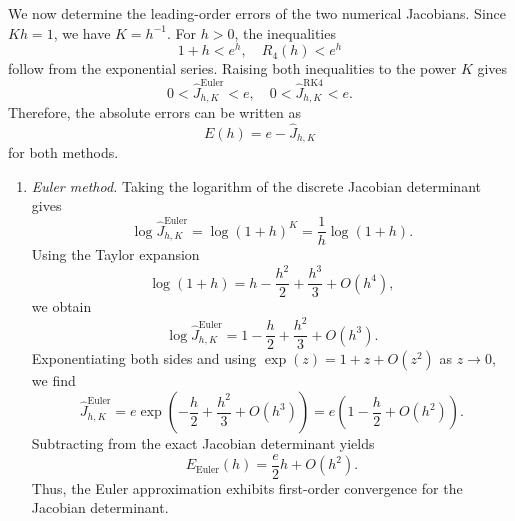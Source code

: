 \documentclass[12pt,a4paper,oneside]{book}
\begin{document}
\begin{solution}
We now determine the leading-order errors of the two numerical Jacobians. Since $Kh=1$, we have $K=h^{-1}$. For $h>0$, the
inequalities
\begin{equation*}
    1+h<e^h,\quad R_4(h)<e^h
\end{equation*}
follow from the exponential series. Raising both inequalities to the power $K$ gives
\begin{equation*}
    0<\widehat J_{h,K}^{\mathrm{Euler}}<e, \quad
    0<\widehat J_{h,K}^{\mathrm{RK4}}<e.
\end{equation*}
Therefore, the absolute errors can be written as
\begin{equation*}
    E(h)=e-\widehat J_{h,K}
\end{equation*}
for both methods.
\begin{enumerate}
    \item \textit{Euler method.}
        Taking the logarithm of the discrete Jacobian determinant gives
        \begin{equation*}
                \log\widehat J_{h,K}^{\mathrm{Euler}} = \log(1+h)^K = \frac{1}{h}\log(1+h).
        \end{equation*}
        Using the Taylor expansion
        \begin{equation*}
            \log(1+h) = h-\frac{h^2}{2}+\frac{h^3}{3}+O(h^4),
        \end{equation*}
        we obtain
        \begin{equation*}
            \log\widehat J_{h,K}^{\mathrm{Euler}} = 1-\frac h2+\frac{h^2}{3}+O(h^3).
        \end{equation*}
        Exponentiating both sides and using $\exp(z)=1+z+O(z^2)$ as $z\to0$, we find
        \begin{equation*}
            \widehat J_{h,K}^{\mathrm{Euler}}
                = e\exp\left(
                    -\frac h2+\frac{h^2}{3}+O(h^3)
                \right)
                = e\left(1-\frac h2+O(h^2)\right).
        \end{equation*}
        Subtracting from the exact Jacobian determinant yields
        \begin{equation*}
            E_{\mathrm{Euler}}(h) = \frac e2h+O(h^2).
        \end{equation*}
        Thus, the Euler approximation exhibits first-order convergence for the Jacobian determinant.


\end{enumerate}
\end{solution}
\end{document}
